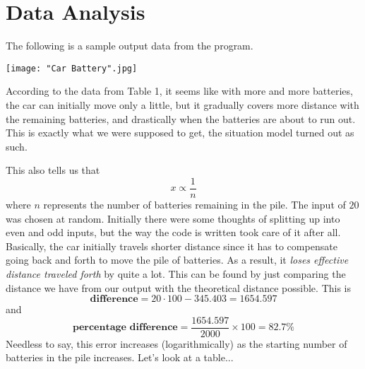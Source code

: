 \documentclass[a4paper, 12pt]{article}
\begin{document}
\section*{Data Analysis}
\begin{flushleft}
	The following is a sample output data from the program.
	\begin{center}
	\texttt{[image: "Car Battery".jpg]}
	\end{center}
	
	According to the data from Table 1, it seems like with more and more batteries, the car can initially move only a little, but it gradually covers more distance with the remaining batteries, and drastically when the batteries are about to run out. This is exactly what we were supposed to get, the situation model turned out as such.
	
	This also tells us that $$x\propto \dfrac{1}{n}$$ where $n$ represents the number of batteries remaining in the pile. The input of $20$ was chosen at random. Initially there were some thoughts of splitting up into even and odd inputs, but the way the code is written took care of it after all. Basically, the car initially travels shorter distance since it has to compensate going back and forth to move the pile of batteries. As a result, it \textit{loses effective distance traveled forth} by quite a lot. This can be found by just comparing the distance we have from our output with the theoretical distance possible. This is $$\textbf{difference} = 20\cdot 100 - 345.403 = 1654.597$$ and $$\textbf{percentage difference}=\dfrac{1654.597}{2000}\times 100 = 82.7\%$$
	Needless to say, this error increases (logarithmically) as the starting number of batteries in the pile increases. Let's look at a table...
	

\end{flushleft}
\end{document}
